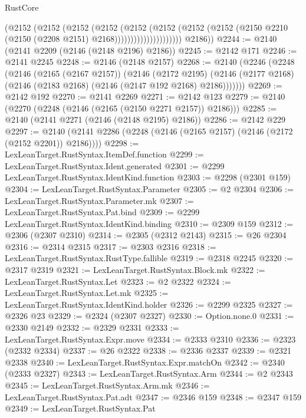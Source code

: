 \begin{lexlean}{RustCore}
\begin{coremodule}
                              (@2152
                                (@2152
                                  (@2152
                                    (@2152
                                      (@2152
                                        (@2152
                                          (@2152
                                            (@2152
                                              (@2150
                                                @2210
                                                (@2150 (@2208 @2151) @2168)))))))))))))))))))))
        @2186))
@2244 := @2140 (@2141 @2209 (@2146 (@2148 @2196) @2186))
@2245 := @2142 @171
@2246 := @2141 @2245
@2248 := @2146 (@2148 @2157)
@2268 := @2140
    (@2246
      (@2248
        (@2146
          (@2165 (@2167 @2157))
          (@2146
            (@2172 @2195)
            (@2146 (@2177 @2168) (@2146 (@2183 @2168) (@2146 (@2147 @192 @2168) @2186)))))))
@2269 := @2142 @192
@2270 := @2141 @2269
@2271 := @2142 @123
@2279 := @2140 (@2270 (@2248 (@2146 (@2165 (@2150 @2271 @2157)) @2186)))
@2285 := @2140 (@2141 @2271 (@2146 (@2148 @2195) @2186))
@2286 := @2142 @229
@2297 := @2140 (@2141 @2286 (@2248 (@2146 (@2165 @2157) (@2146 (@2172 (@2152 @2201)) @2186))))
@2298 := LexLeanTarget.RustSyntax.ItemDef.function
@2299 := LexLeanTarget.RustSyntax.Ident.generated
@2301 := @2299 LexLeanTarget.RustSyntax.IdentKind.function
@2303 := @2298 (@2301 @159)
@2304 := LexLeanTarget.RustSyntax.Parameter
@2305 := @2 @2304
@2306 := LexLeanTarget.RustSyntax.Parameter.mk
@2307 := LexLeanTarget.RustSyntax.Pat.bind
@2309 := @2299 LexLeanTarget.RustSyntax.IdentKind.binding
@2310 := @2309 @159
@2312 := @2306 (@2307 @2310)
@2314 := @2305 (@2312 @2143)
@2315 := @26 @2304
@2316 := @2314 @2315
@2317 := @2303 @2316
@2318 := LexLeanTarget.RustSyntax.RustType.fallible
@2319 := @2318 @2245
@2320 := @2317 @2319
@2321 := LexLeanTarget.RustSyntax.Block.mk
@2322 := LexLeanTarget.RustSyntax.Let
@2323 := @2 @2322
@2324 := LexLeanTarget.RustSyntax.Let.mk
@2325 := LexLeanTarget.RustSyntax.IdentKind.holder
@2326 := @2299 @2325
@2327 := @2326 @23
@2329 := @2324 (@2307 @2327)
@2330 := Option.none.{0}
@2331 := @2330 @2149
@2332 := @2329 @2331
@2333 := LexLeanTarget.RustSyntax.Expr.move
@2334 := @2333 @2310
@2336 := @2323 (@2332 @2334)
@2337 := @26 @2322
@2338 := @2336 @2337
@2339 := @2321 @2338
@2340 := LexLeanTarget.RustSyntax.Expr.matchOn
@2342 := @2340 (@2333 @2327)
@2343 := LexLeanTarget.RustSyntax.Arm
@2344 := @2 @2343
@2345 := LexLeanTarget.RustSyntax.Arm.mk
@2346 := LexLeanTarget.RustSyntax.Pat.adt
@2347 := @2346 @159
@2348 := @2347 @159
@2349 := LexLeanTarget.RustSyntax.Pat

\end{coremodule}
\end{lexlean}
